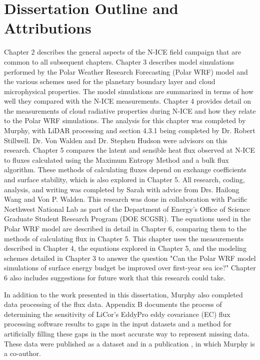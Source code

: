 \section{Dissertation Outline and Attributions}
Chapter 2 describes the general aspects of the N-ICE field campaign that are common to all subsequent chapters. Chapter 3 describes model simulations performed by the Polar Weather Research Forecasting (Polar WRF) model and the various schemes used for the planetary boundary layer and cloud microphysical properties. The model simulations are summarized in terms of how well they compared with the N-ICE measurements. Chapter 4 provides detail on the measurements of cloud radiative properties during N-ICE and how they relate to the Polar WRF simulations. The analysis for this chapter was completed by Murphy, with LiDAR processing and section 4.3.1 being completed by Dr. Robert Stillwell. Dr. Von Walden and Dr. Stephen Hudson were advisors on this research. Chapter 5 compares the latent and sensible heat flux observed at N-ICE to fluxes calculated using the Maximum Entropy Method and a bulk flux algorithm. These methods of calculating fluxes depend on exchange coefficients and surface stability, which is also explored in Chapter 5. All research, coding, analysis, and writing was completed by Sarah with advice from Drs. Hailong Wang and Von P. Walden. This research was done in collaboration with Pacific Northwest National Lab as part of the Department of Energy's Office of Science Graduate Student Research Program (DOE SCGSR). The equations used in the Polar WRF model are described in detail in Chapter 6, comparing them to the methods of calculating flux in Chapter 5. This chapter uses the measurements described in Chapter 4, the equations explored in Chapter 5, and the modeling schemes detailed in Chapter 3 to answer the question "Can the Polar WRF model simulations of surface energy budget be improved over first-year sea ice?" Chapter 6 also includes suggestions for future work that this research could take.

In addition to the work presented in this dissertation, Murphy also completed data processing of the flux data. Appendix B documents the process of determining the sensitivity of LiCor's EddyPro eddy covariance (EC) flux processing software results to gaps in the input datasets and a method for artificially filling these gaps in the most accurate way to represent missing data. These data were published as a dataset \citep{nicefluxes:2017} and in a publication \citep{walden:2017}, in which Murphy is a co-author.


